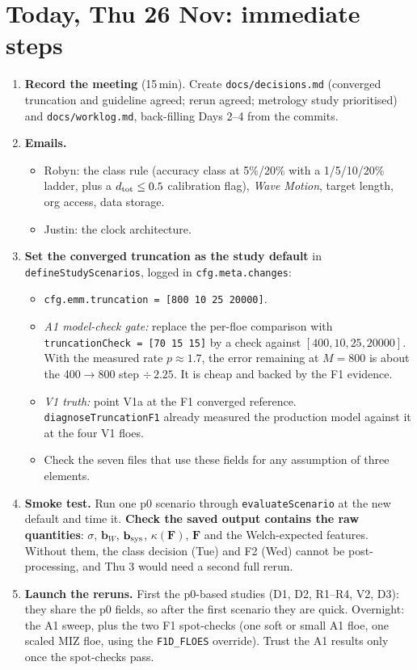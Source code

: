 \documentclass[10pt,a4paper]{article}
\newcommand{\TODO}{$\square$}
\begin{document}
\section{Today, Thu 26 Nov: immediate steps}
\begin{enumerate}
\item[\TODO] \textbf{Record the meeting} (15\,min). Create \texttt{docs/decisions.md} (converged truncation and guideline agreed; rerun agreed; metrology study prioritised) and \texttt{docs/worklog.md}, back-filling Days 2--4 from the commits.
\item[\TODO] \textbf{Emails.}
  \begin{itemize}
  \item Robyn: the class rule (accuracy class at 5\%/20\% with a 1/5/10/20\% ladder, plus a $d_{\rm tot}\le0.5$ calibration flag), \emph{Wave Motion}, target length, org access, data storage.
  \item Justin: the clock architecture.
  \end{itemize}
\item[\TODO] \textbf{Set the converged truncation as the study default} in \texttt{defineStudyScenarios}, logged in \texttt{cfg.meta.changes}:
  \begin{itemize}
  \item \texttt{cfg.emm.truncation = [800 10 25 20000]}.
  \item \emph{A1 model-check gate:} replace the per-floe comparison with \texttt{truncationCheck = [70 15 15]} by a check against $[400,10,25,20000]$. With the measured rate $p\approx1.7$, the error remaining at $M=800$ is about the 400$\to$800 step $\div\,2.25$. It is cheap and backed by the F1 evidence.
  \item \emph{V1 truth:} point V1a at the F1 converged reference. \texttt{diagnoseTruncationF1} already measured the production model against it at the four V1 floes.
  \item Check the seven files that use these fields for any assumption of three elements.
  \end{itemize}
\item[\TODO] \textbf{Smoke test.} Run one p0 scenario through \texttt{evaluateScenario} at the new default and time it. \textbf{Check the saved output contains the raw quantities}: $\sigma$, $\mathbf b_W$, $\mathbf b_{\rm sys}$, $\kappa(\mathbf F)$, $\mathbf F$ and the Welch-expected features. Without them, the class decision (Tue) and F2 (Wed) cannot be post-processing, and Thu 3 would need a second full rerun.
\item[\TODO] \textbf{Launch the reruns.} First the p0-based studies (D1, D2, R1--R4, V2, D3): they share the p0 fields, so after the first scenario they are quick. Overnight: the A1 sweep, plus the two F1 spot-checks (one soft or small A1 floe, one scaled MIZ floe, using the \texttt{F1D\_FLOES} override). Trust the A1 results only once the spot-checks pass.
\end{enumerate}
\end{document}
